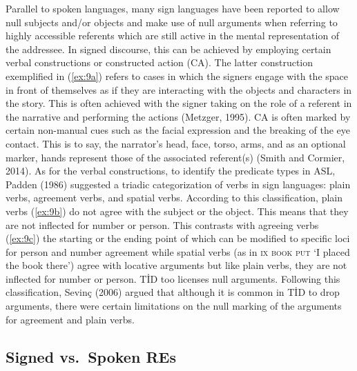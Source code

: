 \documentclass[]{elsarticle} %
\begin{document}
Parallel to spoken languages, many sign languages have been reported to
allow null subjects and/or objects and make use of null arguments when
referring to highly accessible referents which are still active in the
mental representation of the addressee. In signed discourse, this can be
achieved by employing certain verbal constructions or constructed action
(CA). The latter construction exemplified in (\ref{ex:9a}) refers to
cases in which the signers engage with the space in front of themselves
as if they are interacting with the objects and characters in the story.
This is often achieved with the signer taking on the role of a referent
in the narrative and performing the actions (Metzger, 1995). CA is often
marked by certain non-manual cues such as the facial expression and the
breaking of the eye contact. This is to say, the narrator's head, face,
torso, arms, and as an optional marker, hands represent those of the
associated referent(s) (Smith and Cormier, 2014). As for the verbal
constructions, to identify the predicate types in ASL, Padden (1986)
suggested a triadic categorization of verbs in sign languages: plain
verbs, agreement verbs, and spatial verbs. According to this
classification, plain verbs (\ref{ex:9b}) do not agree with the subject
or the object. This means that they are not inflected for number or
person. This contrasts with agreeing verbs (\ref{ex:9c}) the starting or
the ending point of which can be modified to specific loci for person
and number agreement while spatial verbs (as in \textsc{ix book put} `I
placed the book there') agree with locative arguments but like plain
verbs, they are not inflected for number or person. TİD too licenses
null arguments. Following this classification, Sevinç (2006) argued that
although it is common in TİD to drop arguments, there were certain
limitations on the null marking of the arguments for agreement and plain
verbs.

\hypertarget{signed-vs.-spoken-res}{%
\subsection{Signed vs.~Spoken REs}\label{signed-vs.-spoken-res}}
\end{document}
